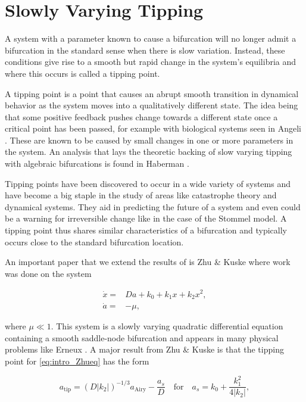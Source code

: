\section*{Slowly Varying Tipping}
A system with a parameter known to cause a bifurcation will no longer admit a bifurcation in the standard sense when there is slow variation. Instead, these conditions give rise to a smooth but rapid change in the system's equilibria and where this occurs is called a tipping point.

A tipping point is a point that causes an abrupt smooth transition in dynamical behavior as the system moves into a qualitatively different state. The idea being that some positive feedback pushes change towards a different state once a critical point has been passed, for example with biological systems seen in Angeli \cite{angeli2004detection}. These are known to be caused by small changes in one or more parameters in the system. An analysis that lays the theoretic backing of slow varying tipping with algebraic bifurcations is found in Haberman \cite{haberman1979slowly}.

Tipping points have been discovered to occur in a wide variety of systems and have become a big staple in the study of areas like catastrophe theory and dynamical systems. They aid in predicting the future of a system and even could be a warning for irreversible change like in the case of the Stommel model. A tipping point thus shares similar characteristics of a bifurcation and typically occurs close to the standard bifurcation location.

An important paper that we extend the results of is Zhu \& Kuske \cite{zhu2015tipping} where work was done on the system

\begin{equation}\label{eq:intro_Zhueq}
\begin{aligned}
\dot{x} =& Da + k_0 +k_1 x + k_2 x^2,\\
\dot{a} =& -\mu,
\end{aligned}
\end{equation}

where $\mu\ll 1$. This system is a slowly varying quadratic differential equation containing a smooth saddle-node bifurcation and appears in many physical problems like Erneux \cite{erneux1989jump}. A major result from Zhu \& Kuske is that the tipping point for \eqref{eq:intro_Zhueq} has the form

\begin{equation}\label{eq:intro_Zhuresult}
a_{\text{tip}}=(D|k_2|)^{-1/3}a_{\text{Airy}}-\frac{a_s}{D}\quad \text{for} \quad a_s = k_0+\frac{k_1^2}{4|k_2|},
\end{equation}

